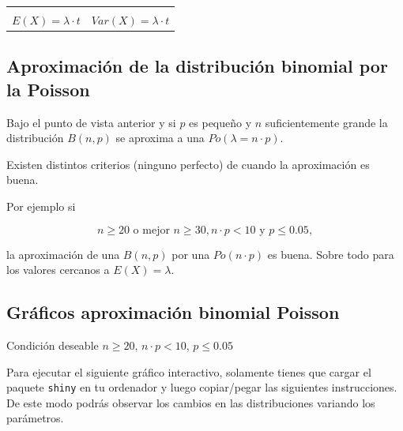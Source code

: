 \documentclass[]{book}
\begin{document}
\begin{longtable}[]{@{}rl@{}}
\begin{minipage}[t]{0.47\columnwidth}
\end{minipage}\tabularnewline
\begin{minipage}[t]{0.47\columnwidth}\raggedleft
\(E(X)=\lambda\cdot t\)\strut
\end{minipage} & \begin{minipage}[t]{0.47\columnwidth}\raggedright
\(Var(X)=\lambda\cdot t\)\strut
\end{minipage}\tabularnewline
\bottomrule
\end{longtable}

\hypertarget{aproximaciuxf3n-de-la-distribuciuxf3n-binomial-por-la-poisson}{%
\subsection{Aproximación de la distribución binomial por la Poisson}\label{aproximaciuxf3n-de-la-distribuciuxf3n-binomial-por-la-poisson}}

Bajo el punto de vista anterior y si \(p\) es pequeño y \(n\) suficientemente grande la distribución \(B(n,p)\) se aproxima a una \(Po(\lambda=n\cdot p)\).

Existen distintos criterios (ninguno perfecto) de cuando la aproximación es buena.

Por ejemplo si

\[n\geq 20\mbox{ o mejor }n\geq 30, n\cdot p < 10 \mbox{ y } p\leq 0.05,\]

la aproximación de una \(B(n,p)\) por una \(Po(n\cdot p)\) es buena. Sobre todo para los valores cercanos a \(E(X)=\lambda\).

\hypertarget{gruxe1ficos-aproximaciuxf3n-binomial-poisson}{%
\subsection{Gráficos aproximación binomial Poisson}\label{gruxe1ficos-aproximaciuxf3n-binomial-poisson}}

Condición deseable \(n\geq 20\), \(n\cdot p < 10\), \(p\leq 0.05\)

Para ejecutar el siguiente gráfico interactivo, solamente tienes que cargar el paquete \texttt{shiny} en tu ordenador y luego copiar/pegar las siguientes instrucciones. De este modo podrás observar los cambios en las distribuciones variando los parámetros.
\end{document}
